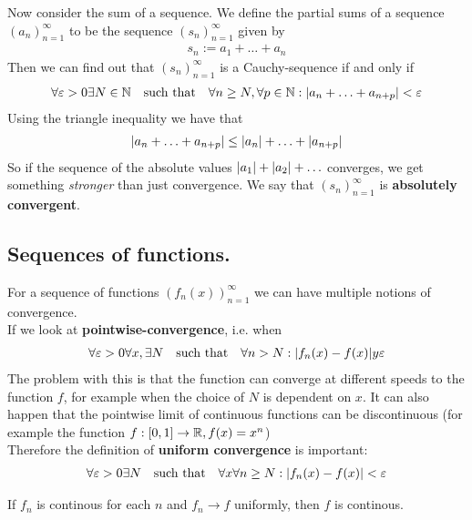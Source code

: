 Now consider the sum of a sequence. We define the partial sums of a sequence $\left(a_{n}\right)_{n = 1}^{\infty}$ to be the sequence $\left(s_{n}\right)_{n = 1}^{\infty}$ given by
\begin{align*}
s_n := a_1 + \ldots + a_n
\end{align*}
Then we can find out that $\left(s_{n}\right)_{n = 1}^{\infty}$ is a Cauchy-sequence if and only if 
\begin{align*}
	\forall \varepsilon > 0 \exists N \in \mathbb{N} \quad \text{such that} \quad \forall n \geq N, \forall p \in \mathbb{N}: \vert a_n + \ldots + a_{n+p}\vert < \varepsilon
\end{align*}
Using the triangle inequality we have that
\begin{align*}
	\vert a_n + \ldots + a_{n+p}\vert \leq \vert a_n\vert + \ldots + \vert a_{n+p}\vert
\end{align*}
So if the sequence of the absolute values $\vert a_1\vert + \vert a_2\vert + \ldots$ converges, we get something \emph{stronger} than just convergence. We say that $\left(s_{n}\right)_{n = 1}^{\infty}$ is \textbf{absolutely convergent}.


\subsection{Sequences of functions.}
For a sequence of functions $\left(f_{n}(x)\right)_{n = 1}^{\infty}$ we can have multiple notions of convergence.\\
If we look at \textbf{pointwise-convergence}, i.e. when
\begin{align*}
	\forall \varepsilon > 0 \forall x, \exists N \quad \text{such that} \quad \forall n > N : \vert f_n(x) - f(x)\vert y \varepsilon
\end{align*}
The problem with this is that the function can converge at different speeds to the function $f$, for example when the choice of $N$ is dependent on $x$. It can also happen that the pointwise limit of continuous functions can be discontinuous (for example the function $f:[0,1] \to \mathbb{R}, f(x) = x^n$)\\

Therefore the definition of \textbf{uniform convergence} is important:
\begin{align*}
	\forall \varepsilon > 0 \exists N \quad \text{such that} \quad \forall x \forall n \geq N: \vert f_n(x) - f(x)\vert < \varepsilon 
\end{align*} 


\begin{proposition}[]
If $f_n$ is continous for each $n$ and $f_n \to f$ uniformly, then $f$ is continous.
\end{proposition}

